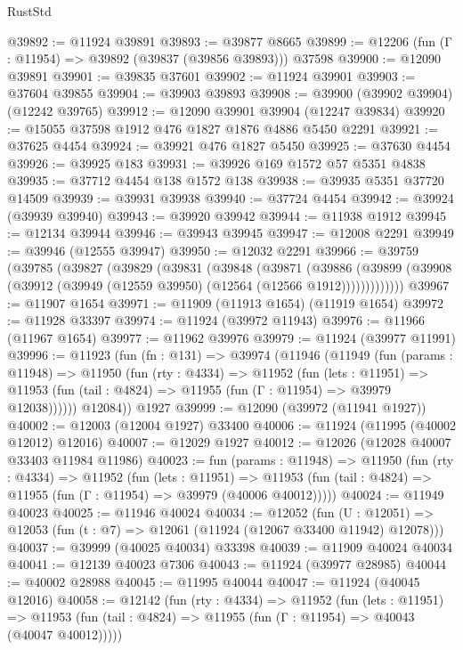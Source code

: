 \begin{lexlean}{RustStd}
\begin{coremodule}
{\begin{coremodule}
{{{{{{{{{{{{{{{{{{{{{{{{{{{{{{{{{{{{{{{{{{{{{{{{{{{{{{{{{{{{{{{{{{{{{{{{{{{{{{{{@39892 := @11924 @39891
@39893 := @39877 @8665
@39899 := @12206 (fun (Γ : @11954) => @39892 (@39837 (@39856 @39893))) @37598
@39900 := @12090 @39891
@39901 := @39835 @37601
@39902 := @11924 @39901
@39903 := @37604 @39855
@39904 := @39903 @39893
@39908 := @39900 (@39902 @39904) (@12242 @39765)
@39912 := @12090 @39901 @39904 (@12247 @39834)
@39920 := @15055 @37598 @1912 @476 @1827 @1876 @4886 @5450 @2291
@39921 := @37625 @4454
@39924 := @39921 @476 @1827 @5450
@39925 := @37630 @4454
@39926 := @39925 @183
@39931 := @39926 @169 @1572 @57 @5351 @4838
@39935 := @37712 @4454 @138 @1572 @138
@39938 := @39935 @5351 @37720 @14509
@39939 := @39931 @39938
@39940 := @37724 @4454
@39942 := @39924 (@39939 @39940)
@39943 := @39920 @39942
@39944 := @11938 @1912
@39945 := @12134 @39944
@39946 := @39943 @39945
@39947 := @12008 @2291
@39949 := @39946 (@12555 @39947)
@39950 := @12032 @2291
@39966 := @39759
    (@39785
      (@39827
        (@39829
          (@39831
            (@39848
              (@39871
                (@39886
                  (@39899 (@39908 (@39912 (@39949 (@12559 @39950) (@12564 (@12566 @1912)))))))))))))
@39967 := @11907 @1654
@39971 := @11909 (@11913 @1654) (@11919 @1654)
@39972 := @11928 @33397
@39974 := @11924 (@39972 @11943)
@39976 := @11966 (@11967 @1654)
@39977 := @11962 @39976
@39979 := @11924 (@39977 @11991)
@39996 := @11923
    (fun (fn : @131) =>
    @39974
      (@11946
        (@11949
          (fun (params : @11948) =>
          @11950
            (fun (rty : @4334) =>
            @11952
              (fun (lets : @11951) =>
              @11953 (fun (tail : @4824) => @11955 (fun (Γ : @11954) => @39979 @12038))))))
        @12084))
    @1927
@39999 := @12090 (@39972 (@11941 @1927))
@40002 := @12003 (@12004 @1927) @33400
@40006 := @11924 (@11995 (@40002 @12012) @12016)
@40007 := @12029 @1927
@40012 := @12026 (@12028 @40007 @33403 @11984 @11986)
@40023 := fun (params : @11948) =>
  @11950
    (fun (rty : @4334) =>
    @11952
      (fun (lets : @11951) =>
      @11953 (fun (tail : @4824) => @11955 (fun (Γ : @11954) => @39979 (@40006 @40012)))))
@40024 := @11949 @40023
@40025 := @11946 @40024
@40034 := @12052
    (fun (U : @12051) => @12053 (fun (t : @7) => @12061 (@11924 (@12067 @33400 @11942) @12078)))
@40037 := @39999 (@40025 @40034) @33398
@40039 := @11909 @40024 @40034
@40041 := @12139 @40023 @7306
@40043 := @11924 (@39977 @28985)
@40044 := @40002 @28988
@40045 := @11995 @40044
@40047 := @11924 (@40045 @12016)
@40058 := @12142
    (fun (rty : @4334) =>
    @11952
      (fun (lets : @11951) =>
      @11953 (fun (tail : @4824) => @11955 (fun (Γ : @11954) => @40043 (@40047 @40012)))))
}}}}}}}}}}}}}}}}}}}}}}}}}}}}}}}}}}}}}}}}}}}}}}}}}}}}}}}}}}}}}}}}}}}}}}}}}}}}}}}}
\end{coremodule}}
\end{coremodule}
\end{lexlean}
